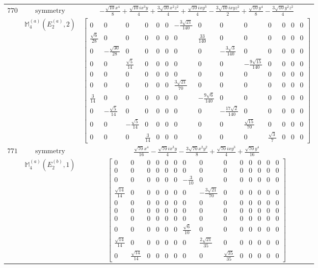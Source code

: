 \documentclass[fleqn,8pt,landscape]{jsarticle}
\begin{document}
\begin{longtable}{ccc}
$ 770 $ & $ \text{symmetry} $ & $ - \frac{\sqrt{10} x^{4}}{8} + \frac{\sqrt{10} i x^{3} y}{4} + \frac{3 \sqrt{10} x^{2} z^{2}}{4} + \frac{\sqrt{10} i x y^{3}}{4} - \frac{3 \sqrt{10} i x y z^{2}}{2} + \frac{\sqrt{10} y^{4}}{8} - \frac{3 \sqrt{10} y^{2} z^{2}}{4} $ \\
$  $ & $ \mathbb{M}_{4}^{(a)}(E_{2}^{(a)},2) $ & $ \begin{bmatrix} 0 & 0 & 0 & 0 & 0 & 0 & - \frac{3 \sqrt{21}}{140} & 0 & 0 & 0 & 0 & 0 & 0 & 0 \\ \frac{\sqrt{6}}{28} & 0 & 0 & 0 & 0 & 0 & 0 & \frac{33}{140} & 0 & 0 & 0 & 0 & 0 & 0 \\ 0 & - \frac{\sqrt{30}}{28} & 0 & 0 & 0 & 0 & 0 & 0 & - \frac{3 \sqrt{3}}{140} & 0 & 0 & 0 & 0 & 0 \\ 0 & 0 & \frac{\sqrt{5}}{14} & 0 & 0 & 0 & 0 & 0 & 0 & - \frac{9 \sqrt{15}}{140} & 0 & 0 & 0 & 0 \\ 0 & 0 & 0 & 0 & 0 & 0 & 0 & 0 & 0 & 0 & 0 & 0 & 0 & 0 \\ 0 & 0 & 0 & 0 & 0 & 0 & \frac{3 \sqrt{21}}{70} & 0 & 0 & 0 & 0 & 0 & 0 & 0 \\ \frac{3}{14} & 0 & 0 & 0 & 0 & 0 & 0 & - \frac{9 \sqrt{6}}{140} & 0 & 0 & 0 & 0 & 0 & 0 \\ 0 & - \frac{\sqrt{5}}{14} & 0 & 0 & 0 & 0 & 0 & 0 & - \frac{17 \sqrt{2}}{140} & 0 & 0 & 0 & 0 & 0 \\ 0 & 0 & - \frac{\sqrt{5}}{14} & 0 & 0 & 0 & 0 & 0 & 0 & \frac{\sqrt{15}}{70} & 0 & 0 & 0 & 0 \\ 0 & 0 & 0 & \frac{3}{14} & 0 & 0 & 0 & 0 & 0 & 0 & \frac{\sqrt{3}}{7} & 0 & 0 & 0 \end{bmatrix} $ \\ \hline
$ 771 $ & $ \text{symmetry} $ & $ \frac{\sqrt{70} x^{4}}{16} - \frac{\sqrt{70} i x^{3} y}{4} - \frac{3 \sqrt{70} x^{2} y^{2}}{8} + \frac{\sqrt{70} i x y^{3}}{4} + \frac{\sqrt{70} y^{4}}{16} $ \\
$  $ & $ \mathbb{M}_{4}^{(a)}(E_{2}^{(b)},1) $ & $ \begin{bmatrix} 0 & 0 & 0 & 0 & 0 & 0 & 0 & 0 & 0 & 0 & 0 & 0 & 0 & 0 \\ 0 & 0 & 0 & 0 & 0 & 0 & 0 & 0 & 0 & 0 & 0 & 0 & 0 & 0 \\ 0 & 0 & 0 & 0 & 0 & 0 & - \frac{3}{10} & 0 & 0 & 0 & 0 & 0 & 0 & 0 \\ \frac{\sqrt{14}}{14} & 0 & 0 & 0 & 0 & 0 & 0 & - \frac{3 \sqrt{21}}{70} & 0 & 0 & 0 & 0 & 0 & 0 \\ 0 & 0 & 0 & 0 & 0 & 0 & 0 & 0 & 0 & 0 & 0 & 0 & 0 & 0 \\ 0 & 0 & 0 & 0 & 0 & 0 & 0 & 0 & 0 & 0 & 0 & 0 & 0 & 0 \\ 0 & 0 & 0 & 0 & 0 & 0 & 0 & 0 & 0 & 0 & 0 & 0 & 0 & 0 \\ 0 & 0 & 0 & 0 & 0 & 0 & \frac{\sqrt{6}}{10} & 0 & 0 & 0 & 0 & 0 & 0 & 0 \\ \frac{\sqrt{14}}{14} & 0 & 0 & 0 & 0 & 0 & 0 & \frac{2 \sqrt{21}}{35} & 0 & 0 & 0 & 0 & 0 & 0 \\ 0 & \frac{\sqrt{14}}{14} & 0 & 0 & 0 & 0 & 0 & 0 & \frac{\sqrt{35}}{35} & 0 & 0 & 0 & 0 & 0 \end{bmatrix} $ \\ \hline

\end{longtable}
\end{document}
